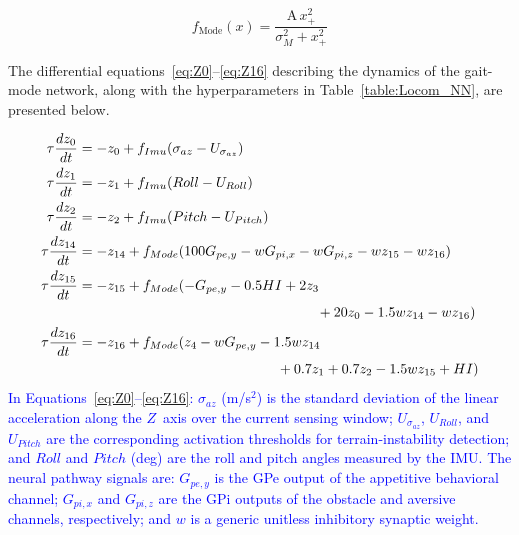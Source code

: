 \documentclass[preprint,12pt]{elsarticle}
\newcommand{\revblue}[1]{\textcolor{blue}{#1}}
\begin{document}
\begin{equation}
f_{\mathrm{Mode}}(x) = \frac{\mathrm{A}\, x_+^2}{\sigma_{M}^2 + x_+^2}
\label{eq:NakaMode}
\end{equation}


The differential equations~\eqref{eq:Z0}–\eqref{eq:Z16} describing the dynamics of the gait-mode network, along with the hyperparameters in Table~\ref{table:Locom_NN}, are presented below. 

\begin{align}
\tau \frac{dz_0}{dt} &= -z_0 + f_{Imu}(\sigma_{az} - U_{\sigma_{az}})
\label{eq:Z0}
\\
\tau \frac{dz_1}{dt} &= -z_1 +  f_{Imu}( Roll - U_{Roll})
\\
\tau \frac{dz_2}{dt} &= -z_2 +  f_{Imu}( Pitch - U_{Pitch})
\\
\tau \frac{dz_{14}}{dt} &= -z_{14} +  f_{Mode}(100 G_{pe,y} - w G_{pi,x}  - w G_{pi,z} - w z_{15} - w z_{16})
\\
\tau \frac{dz_{15}}{dt} &= -z_{15} +f_{Mode}( -G_{pe,y} - 0.5HI + 2z_3 \notag\\
&\hspace*{6cm}+ 20z_0 - 1.5wz_{14} - wz_{16})
\\
\tau \frac{dz_{16}}{dt} &= -z_{16} +  f_{Mode}( z_4 - wG_{pe,y} - 1.5wz_{14}\notag\\
&\hspace{5cm}+ 0.7z_1 + 0.7z_2 - 1.5wz_{15} + HI)
\label{eq:Z16}
\end{align}
\revblue{In Equations~\eqref{eq:Z0}–\eqref{eq:Z16}: $\sigma_{az}$ (m/s$^2$) is the standard deviation of the linear acceleration along the $Z$~axis over the current sensing window; $U_{\sigma_{az}}$, $U_{Roll}$, and $U_{Pitch}$ are the corresponding activation thresholds for terrain-instability detection; and $Roll$ and $Pitch$ (deg) are the roll and pitch angles measured by the IMU.
The neural pathway signals are: $G_{pe,y}$ is the GPe output of the appetitive behavioral channel; $G_{pi,x}$ and $G_{pi,z}$ are the GPi outputs of the obstacle and aversive channels, respectively; and $w$ is a generic unitless inhibitory synaptic weight.}
\end{document}
